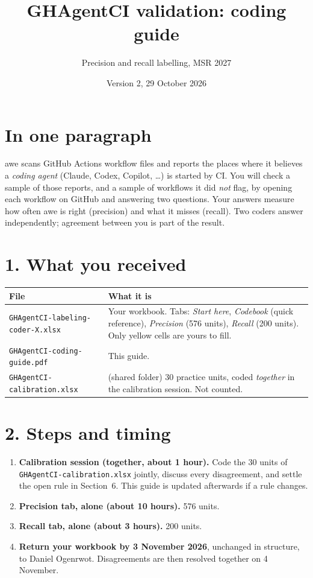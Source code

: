 \documentclass[10pt,a4paper]{article}
\title{GHAgentCI validation: coding guide}
\author{Precision and recall labelling, MSR 2027}
\date{Version 2, 29 October 2026}
\newcommand{\val}[1]{\texttt{#1}}
\begin{document}
\maketitle
\vspace{-1.5em}

\section*{In one paragraph}

\textsf{awe} scans GitHub Actions workflow files and reports the places where
it believes a \emph{coding agent} (Claude, Codex, Copilot, \dots) is started by
CI. You will check a sample of those reports, and a sample of workflows it did
\emph{not} flag, by opening each workflow on GitHub and answering two
questions. Your answers measure how often \textsf{awe} is right (precision) and
what it misses (recall). Two coders answer independently; agreement between you
is part of the result.

\section*{1. What you received}

\begin{tabularx}{\linewidth}{@{}l L@{}}
\toprule
\textbf{File} & \textbf{What it is} \\
\midrule
\val{GHAgentCI-labeling-coder-X.xlsx} & Your workbook. Tabs: \emph{Start here}, \emph{Codebook} (quick reference), \emph{Precision} (576 units), \emph{Recall} (200 units). Only yellow cells are yours to fill. \\
\val{GHAgentCI-coding-guide.pdf} & This guide. \\
\val{GHAgentCI-calibration.xlsx} & (shared folder) 30 practice units, coded \emph{together} in the calibration session. Not counted. \\
\bottomrule
\end{tabularx}

\section*{2. Steps and timing}

\begin{enumerate}
\item \textbf{Calibration session (together, about 1 hour).} Code the 30 units of
\val{GHAgentCI-calibration.xlsx} jointly, discuss every disagreement, and settle
the open rule in Section~6. This guide is updated afterwards if a rule changes.
\item \textbf{Precision tab, alone (about 10 hours).} 576 units.
\item \textbf{Recall tab, alone (about 3 hours).} 200 units.
\item \textbf{Return your workbook by 3 November 2026}, unchanged in structure, to
Daniel Ogenrwot. Disagreements are then resolved together on 4 November.
\end{enumerate}
\end{document}
